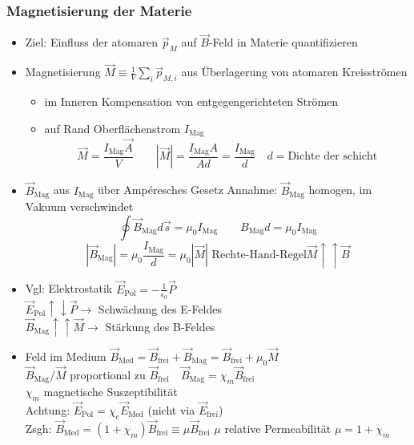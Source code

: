 \documentclass[titlepage,12pt,a4paper,ngerman]{report}
\newcommand{\tx}[1]{\textrm{#1}}
\begin{document}
\subsubsection{Magnetisierung der Materie}
\begin{itemize}
	\item Ziel: Einfluss der atomaren $ \vec{p}_M $ auf $ \vec{B} $-Feld in Materie quantifizieren
	\item Magnetisierung $ \vec{M} \equiv \frac{1}{V} \sum_i \vec{p}_{M,i} $ aus Überlagerung von atomaren Kreisströmen
	\begin{itemize}
		\item im Inneren Kompensation von entgegengerichteten Strömen
		\item auf Rand Oberflächenstrom $ I_{\tx{Mag}} $
		$$ \vec{M} = \frac{I_{\tx{Mag}} \vec{A}}{V} \qquad | \vec{M} | = \frac{I_{\tx{Mag}} A}{A d}  = \frac{I_{\tx{Mag}}}{d} \quad  d = \tx{Dichte der schicht}$$
	\end{itemize}
	\item  $ \vec{B}_{\tx{Mag}} $ aus $ I_{\tx{Mag}} $ über Ampéresches Gesetz Annahme: $ \vec{B}_{\tx{Mag}} $ homogen, im Vakuum verschwindet
	$$ \oint \vec{B}_{\tx{Mag}} d\vec{s} = \mu_0 I_{\tx{Mag}} \qquad B_{\tx{Mag}} d = \mu_0 I_{\tx{Mag}} $$
	$$|\vec{B}_{\tx{Mag}}| = \mu_0 \frac{I_{\tx{Mag}}}{d} = \mu_0 | \vec{M} | \tx{ Rechte-Hand-Regel} \vec{M} \uparrow \uparrow \vec{B}$$
	\item  Vgl: Elektrostatik $ \vec{E}_{\tx{Pol}}  = - \frac{1}{\epsilon_0}  \vec{P} $\\
		$\vec{E}_{\tx{Pol}} \uparrow \downarrow \vec{P} \rightarrow $ Schwächung des E-Feldes\\
		$ \vec{B}_{\tx{Mag}} \uparrow \uparrow \vec{M} \rightarrow $ Stärkung des B-Feldes
	\item Feld im Medium $ \vec{B}_{\tx{Med}} = \vec{B}_{\tx{frei}} + \vec{B}_{\tx{Mag}} = \vec{B}_{\tx{frei}} + \mu_0 \vec{M} $\\
	$  \vec{B}_{\tx{Mag}} / \vec{M} $ proportional zu $ \vec{B}_{\tx{frei}}  \quad \vec{B}_{\tx{Mag}} = \chi_m \vec{B}_{\tx{frei}} $\\
	$ \chi_m $ magnetische Suszeptibilität \\
	Achtung: $ \vec{E}_{\tx{Pol}} = \chi_e \vec{E}_{\tx{Med}} $ (nicht via $ \vec{E}_{\tx{frei}} $)\\
	Zsgh: $ \vec{B}_{\tx{Med}} = (1 + \chi_m) \vec{B}_{\tx{frei}}\equiv \mu \vec{B}_{\tx{frei}} $
	$ \mu $ relative Permeabilität $ \mu = 1 + \chi_m $
\end{itemize}
\end{document}
